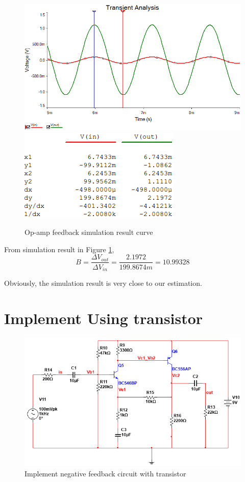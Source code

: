 \begin{figure}[htbp]
	\centering 
	\includegraphics[scale=0.6]{"../Photo/Chap2/Op-amp feedback simulation wave"}\\[0.5cm]
	\includegraphics[scale =1]{"../Photo/Chap2/Op-amp feedback simulation cursor data"}
	\caption{Op-amp  feedback simulation result curve}
	\label{fig:Op-amp  feedback simulation result }
\end{figure}

From simulation result in Figure \ref{fig:Op-amp  feedback simulation result }, 
\[ B = \frac{\Delta V_{out}}{\Delta V_{in}} =  \frac{2.1972}{199.8674m} =  10.99328 \]
 
Obviously, the simulation result is very close to our estimation.


\section{Implement Using transistor}


\begin{figure}[htbp]
\centering
\includegraphics[scale=0.6]{"../Photo/Chap2/transistor feedback"}
\caption{Implement negative feedback circuit with transistor}
\label{fig:transistorfeedback}
\end{figure}

